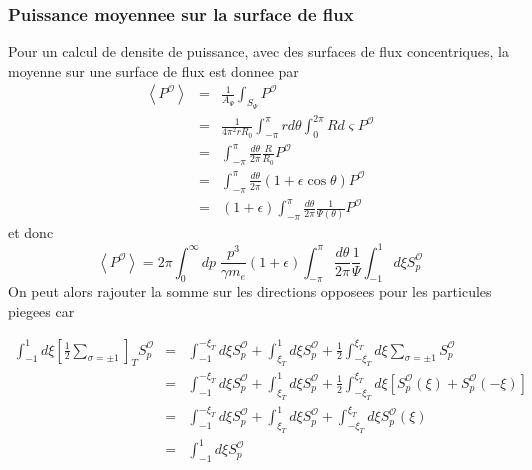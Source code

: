 \subsubsection{Puissance moyennee sur la surface de flux}

Pour un calcul de densite de puissance, avec des surfaces de flux
concentriques, la moyenne sur une surface de flux est donnee par \begin{eqnarray*}
\left\langle P^{\mathcal{O}}\right\rangle  & = & \frac{1}{A_{\Psi}}\int_{S_{\Psi}}P^{\mathcal{O}}\\
 & = & \frac{1}{4\pi^{2}rR_{0}}\int_{-\pi}^{\pi}rd\theta\int_{0}^{2\pi}Rd\varsigma P^{\mathcal{O}}\\
 & = & \int_{-\pi}^{\pi}\frac{d\theta}{2\pi}\frac{R}{R_{0}}P^{\mathcal{O}}\\
 & = & \int_{-\pi}^{\pi}\frac{d\theta}{2\pi}(1+\epsilon\cos\theta)P^{\mathcal{O}}\\
 & = & (1+\epsilon)\int_{-\pi}^{\pi}\frac{d\theta}{2\pi}\frac{1}{\Psi(\theta)}P^{\mathcal{O}}\end{eqnarray*}
 et donc \[
\left\langle P^{\mathcal{O}}\right\rangle =2\pi\int_{0}^{\infty}dp\;\frac{p^{3}}{\gamma m_{e}}(1+\epsilon)\int_{-\pi}^{\pi}\frac{d\theta}{2\pi}\frac{1}{\Psi}\int_{-1}^{1}d\xi S_{p}^{\mathcal{O}}\]
 On peut alors rajouter la somme sur les directions opposees pour
les particules piegees car

\begin{eqnarray*}
\int_{-1}^{1}d\xi\left[\frac{1}{2}\sum_{\sigma=\pm1}\right]_{T}S_{p}^{\mathcal{O}} & = & \int_{-1}^{-\xi_{T}}d\xi S_{p}^{\mathcal{O}}+\int_{\xi_{T}}^{1}d\xi S_{p}^{\mathcal{O}}+\frac{1}{2}\int_{-\xi_{T}}^{\xi_{T}}d\xi\sum_{\sigma=\pm1}S_{p}^{\mathcal{O}}\\
 & = & \int_{-1}^{-\xi_{T}}d\xi S_{p}^{\mathcal{O}}+\int_{\xi_{T}}^{1}d\xi S_{p}^{\mathcal{O}}+\frac{1}{2}\int_{-\xi_{T}}^{\xi_{T}}d\xi\left[S_{p}^{\mathcal{O}}(\xi)+S_{p}^{\mathcal{O}}(-\xi)\right]\\
 & = & \int_{-1}^{-\xi_{T}}d\xi S_{p}^{\mathcal{O}}+\int_{\xi_{T}}^{1}d\xi S_{p}^{\mathcal{O}}+\int_{-\xi_{T}}^{\xi_{T}}d\xi S_{p}^{\mathcal{O}}(\xi)\\
 & = & \int_{-1}^{1}d\xi S_{p}^{\mathcal{O}}\end{eqnarray*}


